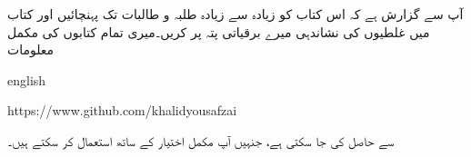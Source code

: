 آپ سے گزارش ہے کہ اس کتاب کو زیادہ سے زیادہ طلبہ و طالبات تک پہنچائیں اور کتاب میں غلطیوں کی نشاندہی میرے   برقیاتی  پتہ پر کریں۔میری تمام کتابوں کی مکمل  معلومات

{
\begin{otherlanguage*}{english}
\begin{LTR}
https:/\!\!/www.github.com/khalidyousafzai
\end{LTR}
\end{otherlanguage*}
}

سے حاصل کی جا سکتی ہے،  جنہیں آپ مکمل اختیار کے ساتھ استعمال کر سکتے ہیں۔
\vspace{5mm}

{}


